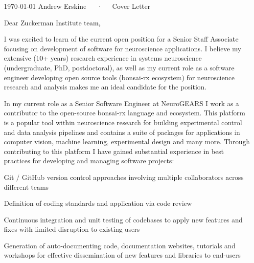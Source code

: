 \documentclass[11pt, letterpaper]{awesome-cv}
\begin{document}
\makecvheader

\makecvfooter
  {\today}
  {Andrew Erskine~~~·~~~Cover Letter}
  {\thepage}



\vspace{5em}

Dear Zuckerman Institute team,

I was excited to learn of the current open position for a Senior Staff Associate focusing on development of software for neuroscience applications. I believe my extensive (10+ years) research experience in systems neuroscience (undergraduate, PhD, postdoctoral), as well as my current role as a software engineer developing open source tools (bonsai-rx ecosystem) for neuroscience research and analysis makes me an ideal candidate for the position.

In my current role as a Senior Software Engineer at NeuroGEARS I work as a contributor to the open-source bonsai-rx language and ecosystem. This platform is a popular tool within neuroscience research for building experimental control and data analysis pipelines and contains a suite of packages for applications in computer vision, machine learning, experimental design and many more. Through contributing to this platform I have gained substantial experience in best practices for developing and managing software projects:
\vspace{1em}
\begin{cvitems}
  \item {Git / GitHub version control approaches involving multiple collaborators across different teams}
  \item {Definition of coding standards and application via code review}
  \item {Continuous integration and unit testing of codebases to apply new features and fixes with limited disruption to existing users}
  \item {Generation of auto-documenting code, documentation websites, tutorials and workshops for effective dissemination of new features and libraries to end-users}
\end{cvitems}
\vspace{1em}
\end{document}

